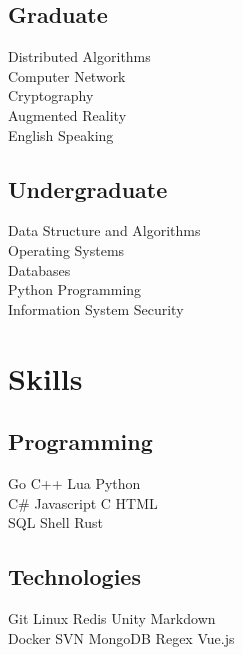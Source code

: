 \documentclass[]{deedy-resume-openfont}
\begin{document}
\begin{minipage}[t]{0.25\textwidth}
\subsection{Graduate}
Distributed Algorithms \\
Computer Network \\
Cryptography \\
Augmented Reality \\
English Speaking \\ 
\sectionsep

\subsection{Undergraduate}
Data Structure and Algorithms \\
Operating Systems \\ 
Databases \\
Python Programming \\
Information System Security


\section{Skills}
\sectionsep
\subsection{Programming}
Go \textbullet{} C++ \textbullet{} Lua \textbullet{} Python \\
C\# \textbullet{} Javascript \textbullet{} C \textbullet{} HTML \\
SQL \textbullet{} Shell \textbullet{} Rust \\ 
\sectionsep

\subsection{Technologies}
Git \textbullet{} Linux \textbullet{} Redis \textbullet{} Unity \textbullet{} Markdown \\
Docker  \textbullet{} SVN \textbullet{} MongoDB \textbullet{} Regex \textbullet{} Vue.js \\
\sectionsep


%
%

\end{minipage} 
\end{document}
